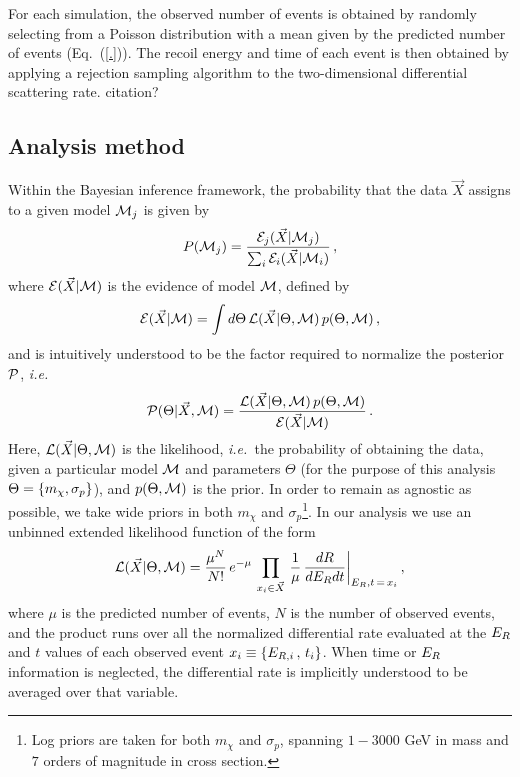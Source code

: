 \documentclass[11pt]{article}
\newcommand{\ie}{{\it i.e.~}}  \newcommand{\eg}{{\it e.g.~}}
\newcommand{\Eq}[1]{Eq.~(\ref{#1})} \newcommand{\Eqs}[2]{Eqs.~(\ref{#1}) and (\ref{#2})} \newcommand{\Eqm}[2]{Eqs.~(\ref{#1}) through (\ref{#2})}
\newcommand{\vgColor}{magenta}
\newcommand{\vg}[1]{{\color{\vgColor} #1}}
\begin{document}
For each simulation, the observed number of events is obtained by randomly selecting from a Poisson distribution with a mean given by the predicted number of events (\Eq{.}). The recoil energy and time of each event is then obtained by applying a rejection sampling algorithm to the two-dimensional differential scattering rate. \vg{citation?}

\subsection{Analysis method}

Within the Bayesian inference framework, the probability that the data $\vec{X}$ assigns to a given model ${\cal M}_j$ is given by
\begin{equation}\label{eq:probs}
P({\cal M}_j) = \frac{{\cal E}_j(\vec{X}|{\cal M}_j)}{\sum_i {\cal E}_i(\vec{X}|{\cal M}_i)} \, ,
\end{equation}
where ${\cal E}(\vec{X}|{\cal M})$ is the evidence of model ${\cal M}$, defined by
\begin{equation}\label{eq:evidence}
{\cal E}(\vec{X}|{\cal M}) = \int d\Theta \, {\cal L}(\vec{X}|\Theta,{\cal M}) \, p(\Theta,{\cal M}) \, ,
\end{equation}
and is intuitively understood to be the factor required to normalize the posterior ${ \cal P}$, \ie
\begin{equation}\label{eq:posterior}
{ \cal P}(\Theta | \vec{X}, {\cal M}) = \frac{{\cal L}(\vec{X}|\Theta,{\cal M})\, p(\Theta,{\cal M})}{{\cal E}(\vec{X}|{\cal M})} \, . 
\end{equation}
Here, ${\cal L}(\vec{X}|\Theta,{\cal M})$ is the likelihood, \ie the probability of obtaining the data, given a particular model ${\cal M}$ and parameters $\Theta$ (for the purpose of this analysis $\Theta = \left\{ m_\chi, \sigma_p \right\}$), and $p(\Theta, {\cal M})$ is the prior. In order to remain as agnostic as possible, we take wide priors in both $m_\chi$ and $\sigma_p$\footnote{Log priors are taken for both $m_\chi$ and $\sigma_p$, spanning $1-3000$ GeV in mass and $7$ orders of magnitude in cross section.}. In our analysis we use an unbinned extended likelihood function of the form
\begin{equation}\label{eq:likelihood}
{\cal L}(\vec{X}|\Theta,{\cal M}) = \frac{\mu^N}{N!} \, e^{-\mu} \, \prod_{x_i \in \vec{X}}\, \frac{1}{\mu} \, \frac{dR}{dE_R dt} \bigg|_{E_R,t \, = \, x_i} \, ,
\end{equation}
where $\mu$ is the predicted number of events, $N$ is the number of observed events, and the product runs over all the normalized differential rate evaluated at the $E_R$ and $t$ values of each observed event $x_i \equiv \left\{ E_{R,i} \, , \, t_i \right\}$. When time or $E_R$ information is neglected, the differential rate is implicitly understood to be averaged over that variable. 
\end{document}

